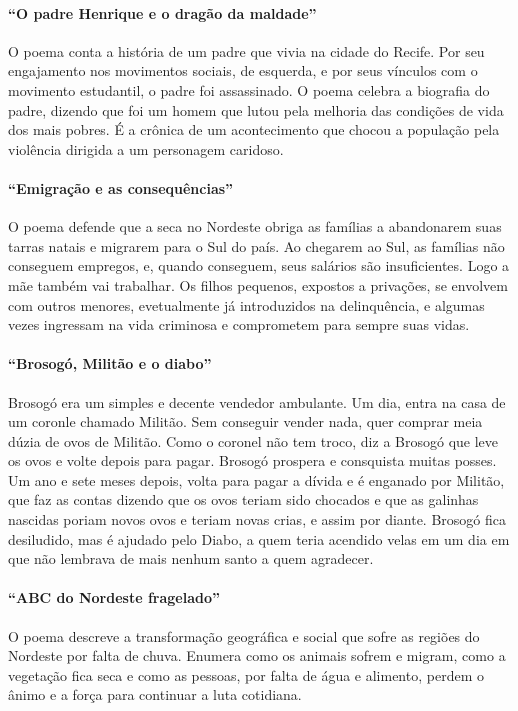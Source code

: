 \paragraph{“O padre Henrique e o dragão da maldade”} O poema conta a história
de um padre que vivia na cidade do Recife. Por seu engajamento nos movimentos
sociais, de esquerda, e por seus vínculos com o movimento estudantil, o padre
foi assassinado. O poema celebra a biografia do padre, dizendo que foi um homem
que lutou pela melhoria das condições de vida dos mais pobres. É a crônica de
um acontecimento que chocou a população pela violência dirigida a um personagem
caridoso.

\paragraph{“Emigração e as consequências”} O poema defende que a seca no
Nordeste obriga as famílias a abandonarem suas tarras natais e migrarem para o
Sul do país. Ao chegarem ao Sul, as famílias não conseguem empregos, e, quando
conseguem, seus salários são insuficientes. Logo a mãe também vai trabalhar. Os
filhos pequenos, expostos a privações, se envolvem com outros menores,
evetualmente já introduzidos na delinquência, e algumas vezes ingressam na vida
criminosa e comprometem para sempre suas vidas.

\paragraph{“Brosogó, Militão e o diabo”} Brosogó era um simples e decente
vendedor ambulante. Um dia, entra na casa de um coronle chamado Militão. Sem
conseguir vender nada, quer comprar meia dúzia de ovos de Militão. Como o
coronel não tem troco, diz a Brosogó que leve os ovos e volte depois para
pagar. Brosogó prospera e consquista muitas posses. Um ano e sete meses depois,
volta para pagar a dívida e é enganado por Militão, que faz as contas dizendo
que os ovos teriam sido chocados e que as galinhas nascidas poriam novos ovos e
teriam novas crias, e assim por diante. Brosogó fica desiludido, mas é ajudado
pelo Diabo, a quem teria acendido velas em um dia em que não lembrava de mais
nenhum santo a quem agradecer. 

\paragraph{“ABC do Nordeste fragelado”} O poema descreve a transformação
geográfica e social que sofre as regiões do Nordeste por falta de chuva.
Enumera como os animais sofrem e migram, como a vegetação fica seca e como as
pessoas, por falta de água e alimento, perdem o ânimo e a força para continuar
a luta cotidiana. 

